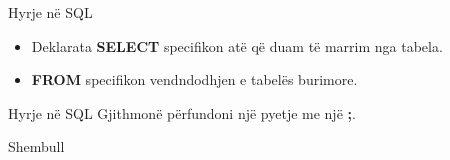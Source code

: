 \documentclass[
  ignorenonframetext,
]{beamer}
\newenvironment{Shaded}{\begin{snugshade}}{\end{snugshade}}
\newcommand{\KeywordTok}[1]{\textcolor[rgb]{0.13,0.29,0.53}{\textbf{#1}}}
\newcommand{\NormalTok}[1]{#1}
\begin{document}
\begin{frame}{Hyrje në SQL}
\label{hyrje-nuxeb-sql-3}
\begin{itemize}
\item
  Deklarata \textbf{SELECT} specifikon atë që duam të marrim nga tabela.
\item
  \textbf{FROM} specifikon vendndodhjen e tabelës burimore.
\end{itemize}
\end{frame}

\begin{frame}{Hyrje në SQL}
\label{hyrje-nuxeb-sql-4}
Gjithmonë përfundoni një pyetje me një \textbf{;}.
\end{frame}

\begin{frame}[fragile]{Shembull}
\label{shembull}
\begin{Shaded}
\end{Shaded}
\end{frame}
\end{document}
